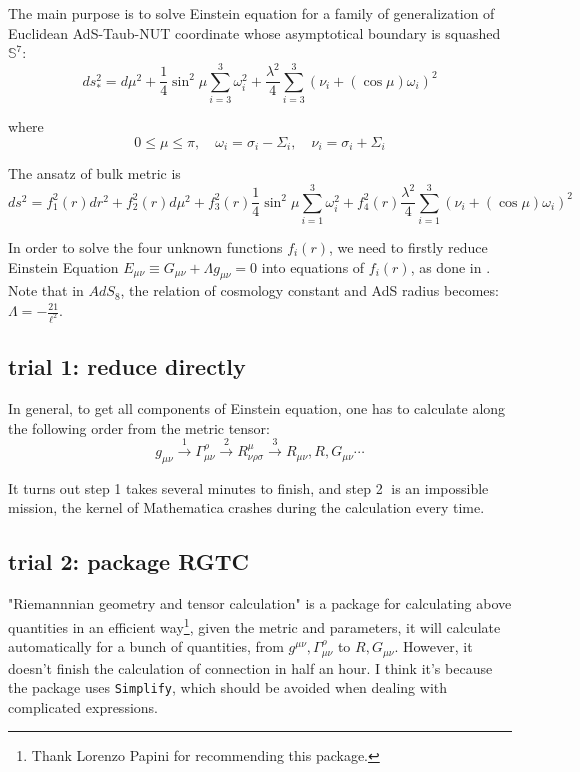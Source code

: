 \documentclass[12pt, a4paper]{article}
\numberwithin{equation}{section}
\newcommand{\be}{\begin{equation}}
\newcommand{\ee}{\end{equation}}
\begin{document}
	The main purpose is to solve Einstein equation for a family of generalization of Euclidean AdS-Taub-NUT coordinate whose asymptotical boundary is squashed $\mathbb{S}^7$:\cite{Page:1983es}\cite{Ooguri:2008ss}
\be
	ds_{*}^2 = d\mu^2 +\frac{1}{4}\sin^2\mu \sum\limits_{i=3}^3 \omega_i^2 + \frac{\lambda^2}{4}\sum\limits_{i=3}^3 (\nu_i + (\cos\mu)\omega_i)^2
	\label{ds2star}
\ee

	where
\be
	0 \le \mu \le \pi, \quad \omega_i = \sigma_i -\Sigma_i ,\quad \nu_i = \sigma_i + \Sigma_i
\ee

	The ansatz of bulk metric is
\be	
	ds^2 = f_1^2(r)dr^2 + f_2^2(r)d\mu^2 + f_3^2(r)\frac{1}{4}\sin^2\mu \sum\limits_{i=1}^3 \omega_i^2 + f_4^2(r)\frac{\lambda^2}{4}\sum\limits_{i=1}^3 (\nu_i + (\cos\mu)\omega_i)^2
\ee

	In order to solve the four unknown functions $f_i(r)$, we need to firstly reduce Einstein Equation $E_{\mu\nu} \equiv G_{\mu\nu} + \Lambda g_{\mu\nu} = 0$ into equations of $f_i(r)$, as done in \cite{Bobev:2016sh}. Note that in $AdS_8$, the relation of cosmology constant and AdS radius becomes: $\Lambda = -\frac{21}{\ell^2}$.

\subsection{trial 1: reduce directly}	
	In general, to get all components of Einstein equation, one has to calculate along the following order from the metric tensor:
	\be
		g_{\mu\nu} \stackrel{1} {\longrightarrow} \Gamma^\rho_{\mu\nu} \stackrel{2}{\longrightarrow} R^\mu_{\nu\rho\sigma} \stackrel{3}{\longrightarrow} R_{\mu\nu}, R, G_{\mu\nu}\cdots 
		\label{route}
	\ee
	
	It turns out step 1 takes several minutes to finish, and step \textcircled{\small 2} is an impossible mission, the kernel of Mathematica crashes during the calculation every time.
	
\subsection{trial 2: package RGTC}
	"Riemannnian geometry and tensor calculation" is a package for calculating above quantities in an efficient way\footnote{Thank Lorenzo Papini for recommending this package.}, given the metric and parameters, it will calculate automatically for a bunch of quantities, from $g^{\mu\nu}, \Gamma^\rho_{\mu\nu}$ to $R, G_{\mu\nu}$. However, it doesn't finish the calculation of connection in half an hour. I think it's because the package uses {\tt Simplify}, which should be avoided when dealing with complicated expressions. 
	
\end{document}
